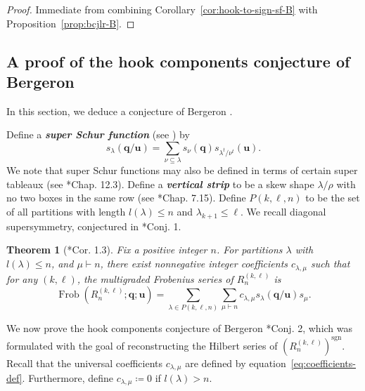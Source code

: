 \documentclass[11pt, reqno]{amsart}
\newtheorem{theorem}{Theorem}[section]
\theoremstyle{definition}
\theoremstyle{remark}
\numberwithin{equation}{section}
\newcommand{\0}{\emptyset}
\DeclareMathOperator{\Frob}{Frob}
\DeclareMathOperator{\sgn}{sgn}
\newcommand{\newword}[1]{\emph{\textbf{#1}}}
\begin{document}
\begin{proof}
    Immediate from combining Corollary~\ref{cor:hook-to-sign-sf-B} with Proposition~\ref{prop:bcjlr-B}.
\end{proof}

\subsection{A proof of the hook components conjecture of Bergeron}

In this section, we deduce a conjecture of Bergeron \cite{BergeronOPAC}.

Define a \newword{super Schur function} (see \cites{BereleRegev,ChengWangBook}) by 
\begin{equation}\label{eq:superschur}
    s_\lambda(\mathbf{q}/\mathbf{u}) = \sum_{\nu \subseteq \lambda} s_\nu(\mathbf{q}) s_{\lambda^t/\nu^t}(\mathbf{u}).
\end{equation}
We note that super Schur functions may also be defined in terms of certain super tableaux (see \cite{Musson}*{Chap. 12.3}). 
Define a \newword{vertical strip} to be a skew shape $\lambda/\rho$ with no two boxes in the same row (see \cite{StanleyEC2}*{Chap. 7.15}). 
Define $P(k,\ell,n)$ to be the set of all partitions with length $l (\lambda) \leq n$ and $\lambda_{k+1} \leq \ell$.
We recall diagonal supersymmetry, conjectured in \cite{Bergeron2020}*{Conj. 1}.
\begin{theorem}[{\cite{Lentfer-Supersymmetry}*{Cor. 1.3}}]\label{thm:DSS-S_n}
    Fix a positive integer $n$. 
    For partitions $\lambda$ with $l(\lambda) \leq n$, and $\mu \vdash n$, there exist nonnegative integer coefficients $c_{\lambda,\mu}$ such that for any $(k,\ell)$, the multigraded Frobenius series of $R_n^{(k,\ell)}$ is
\begin{equation}\label{eq:coefficients-def}
    \Frob\left(R_n^{(k,\ell)}; \mathbf{q};\mathbf{u}\right) = 
    \sum_{\lambda \in P(k,\ell,n)} \sum_{\mu \vdash n} 
    c_{\lambda,\mu} s_\lambda(\mathbf{q}/\mathbf{u})s_\mu. 
\end{equation}
\end{theorem}

We now prove the hook components conjecture of Bergeron \cite{BergeronOPAC}*{Conj. 2}, 
which was formulated with the goal of reconstructing the Hilbert series of 
$\left(R_n^{(k,\ell)}\right)^{\sgn}$. 
Recall that the universal coefficients $c_{\lambda,\mu}$ 
are defined by equation~\eqref{eq:coefficients-def}. 
Furthermore, define $c_{\lambda,\mu}\coloneqq0$ if $l(\lambda)>n$. 
\end{document}

